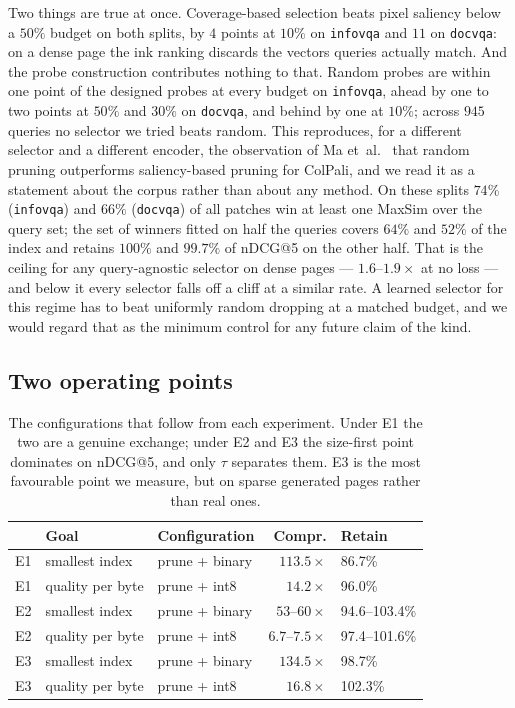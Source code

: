 \documentclass[conference]{IEEEtran}
\begin{document}
Two things are true at once. Coverage-based selection beats pixel saliency
below a $50\%$ budget on both splits, by $4$ points at $10\%$ on
\texttt{infovqa} and $11$ on \texttt{docvqa}: on a dense page the ink ranking
discards the vectors queries actually match. And the probe construction
contributes nothing to that. Random probes are within one point of the designed
probes at every budget on \texttt{infovqa}, ahead by one to two points at
$50\%$ and $30\%$ on \texttt{docvqa}, and behind by one at $10\%$; across $945$
queries no selector we tried beats random. This reproduces, for a different
selector and a different encoder, the observation of Ma
et~al.~\cite{lightcolpali} that random pruning outperforms saliency-based
pruning for ColPali, and we read it as a statement about the corpus rather than
about any method. On these splits $74\%$ (\texttt{infovqa}) and $66\%$
(\texttt{docvqa}) of all patches win at least one MaxSim over the query set; the
set of winners fitted on half the queries covers $64\%$ and $52\%$ of the index
and retains $100\%$ and $99.7\%$ of nDCG@5 on the other half. That is the
ceiling for any query-agnostic selector on dense pages --- $1.6$--$1.9\times$ at
no loss --- and below it every selector falls off a cliff at a similar rate. A
learned selector for this regime has to beat uniformly random dropping at a
matched budget, and we would regard that as the minimum control for any future
claim of the kind.

\subsection{Two operating points}
\begin{table}[!t]
\caption{The configurations that follow from each experiment. Under E1 the two
are a genuine exchange; under E2 and E3 the size-first point dominates on
nDCG@5, and only $\tau$ separates them. E3 is the most favourable point we
measure, but on sparse generated pages rather than real ones.}
\label{tab:operating}
\centering
\setlength{\tabcolsep}{4pt}
\begin{tabular}{@{}lllrl@{}}
\toprule
& \textbf{Goal} & \textbf{Configuration} & \textbf{Compr.} & \textbf{Retain} \\
\midrule
E1 & smallest index & prune + binary & $113.5\times$ & 86.7\% \\
E1 & quality per byte & prune + int8 & $14.2\times$ & 96.0\% \\
\midrule
E2 & smallest index & prune + binary & $53$--$60\times$ & 94.6--103.4\% \\
E2 & quality per byte & prune + int8 & $6.7$--$7.5\times$ & 97.4--101.6\% \\
\midrule
E3 & smallest index & prune + binary & $134.5\times$ & 98.7\% \\
E3 & quality per byte & prune + int8 & $16.8\times$ & 102.3\% \\
\bottomrule
\end{tabular}
\end{table}
\end{document}
